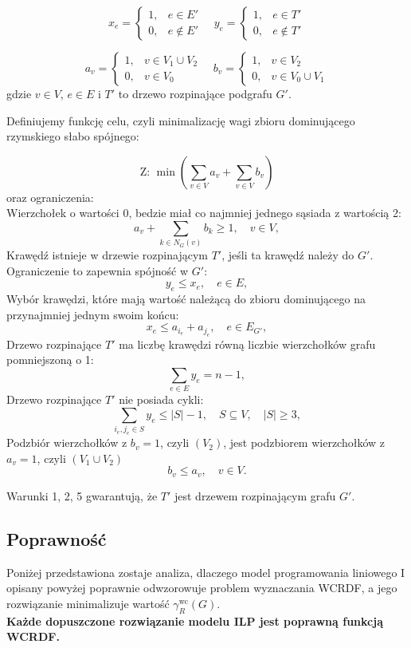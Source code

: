 \[
x_e =
\begin{cases}
1, & e \in E' \\
0, & e \notin E'
\end{cases}
\quad
y_e =
\begin{cases}
1, & e \in T' \\
0, & e \notin T'
\end{cases}
\]

\[
a_v =
\begin{cases}
1, & v \in V_1 \cup V_2 \\
0, & v \in V_0
\end{cases}
\quad
b_v =
\begin{cases}
1, & v \in V_2 \\
0, & v \in V_0 \cup V_1
\end{cases}
\]
gdzie \( v \in V \), \( e \in E \) i \( T' \) to drzewo rozpinające podgrafu \( G' \).

Definiujemy funkcję celu, czyli minimalizację wagi zbioru dominującego rzymskiego słabo spójnego:

\[
\text{Z: } \min \left( \sum_{v \in V} a_v + \sum_{v \in V} b_v \right)
\]
oraz ograniczenia:\\
Wierzchołek o wartości 0, bedzie miał co najmniej jednego sąsiada z wartością 2:
\[
    a_v + \sum_{k \in N_G(v)} b_k \geq 1, \quad v \in V, \tag{1}
\]
Krawędź istnieje w drzewie rozpinającym \( T' \), jeśli ta krawędź należy do \( G' \). Ograniczenie to zapewnia spójność w \( G' \):
\[
    y_e \leq x_e, \quad e \in E, \tag{2}
\]
Wybór krawędzi, które mają  wartość należącą do zbioru dominującego na przynajmniej jednym swoim końcu:
\[
    x_e \leq a_{i_e} + a_{j_e}, \quad e \in E_{G'}, \tag{3}
\]
Drzewo rozpinające \( T' \) ma liczbę krawędzi równą liczbie wierzchołków grafu pomniejszoną o 1:
\[
    \sum_{e \in E} y_e = n - 1, \tag{4}
\]
Drzewo rozpinające \( T' \) nie posiada cykli:
\[
    \sum_{i_e, j_e \in S} y_e \leq |S| - 1, \quad S \subseteq V, \quad |S| \geq 3, \tag{5}
\]
Podzbiór wierzchołków z $b_v = 1$, czyli $(V_2)$, jest podzbiorem wierzchołków z $a_v = 1$, czyli $(V_1 \cup V_2)$
\[
    b_v \leq a_v, \quad v \in V. \tag{6}
\]

Warunki 1, 2, 5 gwarantują, że \( T' \) jest drzewem rozpinającym grafu \( G' \).

\subsection{Poprawność}

Poniżej przedstawiona zostaje analiza, dlaczego model programowania liniowego I opisany powyżej poprawnie odwzorowuje problem wyznaczania WCRDF, a jego rozwiązanie minimalizuje wartość $\gamma_R^{\text{wc}}(G)$.\\
\textbf{Każde dopuszczone rozwiązanie modelu ILP jest poprawną funkcją WCRDF.}


